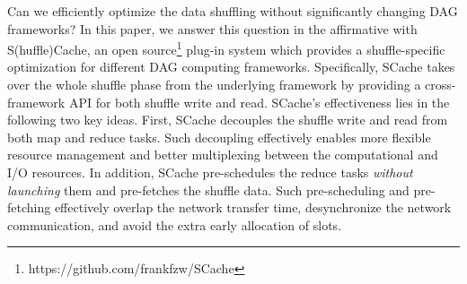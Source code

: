 







Can we efficiently optimize the data shuffling without significantly changing DAG frameworks?
In this paper, we answer this question in the affirmative with S(huffle)Cache, an open source\footnote{https://github.com/frankfzw/SCache} plug-in system which provides a shuffle-specific optimization for different DAG computing frameworks.
Specifically, SCache takes over the whole shuffle phase from the underlying framework by providing a cross-framework API for both shuffle write and read.
SCache's effectiveness lies in the following two key ideas.
First, SCache decouples the shuffle write and read from both map and reduce tasks.
Such decoupling effectively enables more flexible resource management and better multiplexing between the computational and I/O resources.
In addition, SCache pre-schedules the reduce tasks \emph{without launching} them and pre-fetches the shuffle data. 
Such pre-scheduling and pre-fetching effectively overlap the network transfer time, desynchronize the network communication, 
and avoid the extra early allocation of slots.

